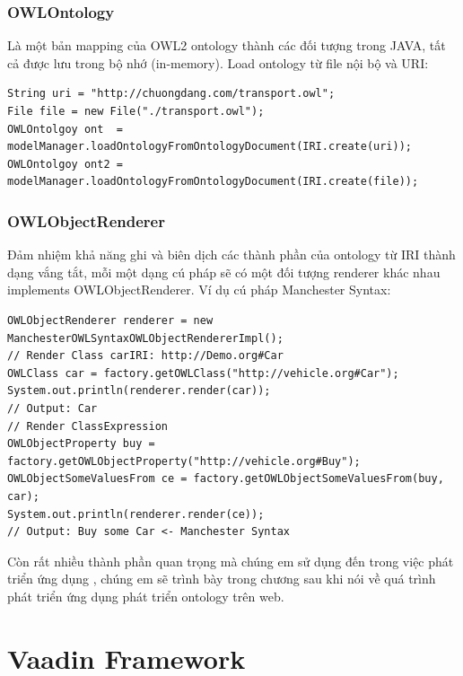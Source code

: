\subsubsection{OWLOntology}
Là một bản mapping của OWL2 ontology thành các đối tượng trong JAVA, tất cả được lưu trong bộ nhớ (in-memory). Load ontology từ file nội bộ và URI:
\begin{verbatim}
String uri = "http://chuongdang.com/transport.owl";
File file = new File("./transport.owl");
OWLOntolgoy ont  = modelManager.loadOntologyFromOntologyDocument(IRI.create(uri));
OWLOntolgoy ont2 = modelManager.loadOntologyFromOntologyDocument(IRI.create(file));
\end{verbatim}
\subsubsection{OWLObjectRenderer}
Đảm nhiệm khả năng ghi và biên dịch các thành phần của ontology từ IRI thành dạng vắng tắt, mỗi một dạng cú pháp sẽ có một đối tượng renderer khác nhau implements OWLObjectRenderer. Ví dụ cú pháp Manchester Syntax:
\begin{verbatim}
OWLObjectRenderer renderer = new ManchesterOWLSyntaxOWLObjectRendererImpl();
// Render Class carIRI: http://Demo.org#Car
OWLClass car = factory.getOWLClass("http://vehicle.org#Car");
System.out.println(renderer.render(car));
// Output: Car
// Render ClassExpression
OWLObjectProperty buy = factory.getOWLObjectProperty("http://vehicle.org#Buy");
OWLObjectSomeValuesFrom ce = factory.getOWLObjectSomeValuesFrom(buy, car);
System.out.println(renderer.render(ce));
// Output: Buy some Car <- Manchester Syntax
\end{verbatim}
Còn rất nhiều thành phần quan trọng mà chúng em sử dụng đến trong việc phát triển ứng dụng , chúng em sẽ trình bày trong chương sau khi nói về quá trình phát triển ứng dụng phát triển ontology trên web.

\section{Vaadin Framework }

